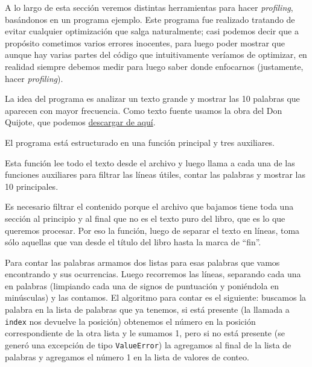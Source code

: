 A lo largo de esta sección veremos distintas herramientas para hacer \textit{profiling}, basándonos en un programa ejemplo. Este programa fue realizado tratando de evitar cualquier optimización que salga naturalmente; casi podemos decir que a propósito cometimos varios errores inocentes, para luego poder mostrar que aunque hay varias partes del código que intuitivamente veríamos de optimizar, en realidad siempre debemos medir para luego saber donde enfocarnos (justamente, hacer \textit{profiling}).

La idea del programa es analizar un texto grande y mostrar las 10 palabras que aparecen con mayor frecuencia. Como texto fuente usamos la obra del Don Quijote, que podemos \href{https://www.gutenberg.org/cache/epub/2000/pg2000.txt}{descargar de aquí}.

El programa está estructurado en una función principal y tres auxiliares.


Esta función lee todo el texto desde el archivo y luego llama a cada una de las funciones auxiliares para filtrar las líneas útiles, contar las palabras y mostrar las 10 principales.


Es necesario filtrar el contenido porque el archivo que bajamos tiene toda una sección al principio y al final que no es el texto puro del libro, que es lo que queremos procesar. Por eso la función, luego de separar el texto en líneas, toma sólo aquellas que van desde el título del libro hasta la marca de ``fin''.


Para contar las palabras armamos dos listas para esas palabras que vamos encontrando y sus ocurrencias. Luego recorremos las líneas, separando cada una en palabras (limpiando cada una de signos de puntuación y poniéndola en minúsculas) y las contamos. El algoritmo para contar es el siguiente: buscamos la palabra en la lista de palabras que ya tenemos, si está presente (la llamada a \texttt{index} nos devuelve la posición) obtenemos el número en la posición correspondiente de la otra lista y le sumamos 1, pero si no está presente (se generó una excepción de tipo \texttt{ValueError}) la agregamos al final de la lista de palabras y agregamos el número 1 en la lista de valores de conteo. 

